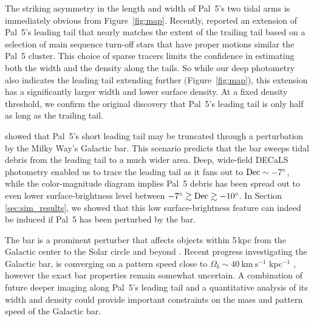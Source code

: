 \documentclass[twocolumn]{aastex62}
\newcommand{\kms}{\ensuremath{\textrm{km}~\textrm{s}^{-1}}}
\begin{document}
The striking asymmetry in the length and width of Pal~5's two tidal arms is immediately obvious from Figure~\ref{fig:map}.
Recently, \citet{Starkman:2019} reported an extension of Pal~5's leading tail that nearly matches the extent of the trailing tail based on a selection of main sequence turn-off stars that have proper motions similar the Pal~5 cluster.
This choice of sparse tracers limits the confidence in estimating both the width and the density along the tails.
So while our deep photometry also indicates the leading tail extending further (Figure~\ref{fig:map}), this extension has a significantly larger width and lower surface density.
At a fixed density threshold, we confirm the original \citet{Bernard:2016} discovery that Pal~5's leading tail is only half as long as the trailing tail.

\citet{Pearson:2017} showed that Pal~5's short leading tail may be truncated through a perturbation by the Milky Way's Galactic bar.
This scenario predicts that the bar sweeps tidal debris from the leading tail to a much wider area.
Deep, wide-field DECaLS photometry enabled us to trace the leading tail as it fans out to $\rm Dec\sim-7^\circ$, while the color-magnitude diagram implies Pal~5 debris has been spread out to even lower surface-brightness level between $-7^\circ\gtrsim\rm Dec\gtrsim-10^\circ$.
In Section \ref{sec:sim_results}, we showed that this low surface-brightness feature can indeed be induced if Pal~5 has been perturbed by the bar.

The bar is a prominent perturber that affects objects within 5\,kpc from the Galactic center \citep[e.g., the Ophiuchus stream,][]{Price-Whelan:2016b, Hattori:2016} to the Solar circle and beyond \citep[e.g., local phase-space overdensities][]{Hunt:2018, Monari:2019}.
Recent progress investigating the Galactic bar, is converging on a pattern speed close to $\Omega_b \sim 40 ~\kms$ kpc$^{-1}$ \citep[e.g.,][]{Clarke:2019, Sanders:2019, Bovy:2019}, however the exact bar properties remain somewhat uncertain.
A combination of future deeper imaging along Pal~5's leading tail and a quantitative analysis of its width and density could provide important constraints on the mass and pattern speed of the Galactic bar.
\end{document}
